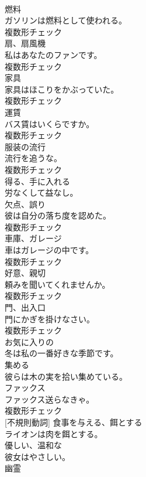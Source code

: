 \documentclass[8pt]{extreport}
\begin{document}
\begin{CJK}{UTF8}{min}
\\	[名詞]	燃料	
\\	ガソリンは燃料として使われる。	
\\	複数形チェック
\\	[名詞]	扇、扇風機	
\\	私はあなたのファンです。	
\\	複数形チェック
\\	[名詞]	家具	
\\	家具はほこりをかぶっていた。	
\\	複数形チェック
\\	[名詞]	運賃	
\\	バス賃はいくらですか。	
\\	複数形チェック
\\	[名詞]	服装の流行	
\\	流行を追うな。	
\\	複数形チェック
\\	[動詞]	得る、手に入れる	
\\	労なくして益なし。	
\\	[名詞]	欠点、誤り	
\\	彼は自分の落ち度を認めた。	
\\	複数形チェック
\\	[名詞]	車庫、ガレージ	
\\	車はガレージの中です。	
\\	複数形チェック
\\	[名詞]	好意、親切	
\\	頼みを聞いてくれませんか。	
\\	複数形チェック
\\	[名詞]	門、出入口	
\\	門にかぎを掛けなさい。	
\\	複数形チェック
\\	[形容詞]	お気に入りの	
\\	冬は私の一番好きな季節です。	
\\	[動詞]	集める	
\\	彼らは木の実を拾い集めている。	
\\	[名詞]	ファックス	
\\	ファックス送らなきゃ。	
\\	複数形チェック
\\	[動詞] [不規則動詞]	食事を与える、餌とする	
\\	ライオンは肉を餌とする。	
\\	[形容詞]	優しい、温和な	
\\	彼女はやさしい。	
\\	[名詞]	幽霊	

\end{CJK}
\end{document}
